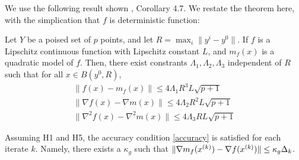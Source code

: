 We use the following result shown \cite{Billups_Larson_2013}, Corollary 4.7.
We restate the theorem here, with the simplication that $f$ is deterministic function:
\begin{lemma}
\label{change_radius}
Let $Y$ be a poised set of $p$ points, and let $R = \max_{i}\|y^i - y^0\|$.
If $f$ is a Lipschitz continuous function with Lipschitz constant $L$, and $m_f(x)$ is a quadratic model of $f$.
Then, there exist constrants $\Lambda_1, \Lambda_2, \Lambda_3$ independent of $R$ such that for all $x \in B(y^0, R)$,
\begin{align*}
\|f(x) - m_f(x)\| \le 4\Lambda_1 R^3L \sqrt{p+1} \\
\|\nabla f(x) - \nabla m(x)\| \le 4\Lambda_2R^2  L \sqrt{p+1} \\
\|\nabla^2 f(x) - \nabla^2 m(x)\| \le 4\Lambda_3  RL \sqrt{p+1}
\end{align*}
\end{lemma}





\begin{lemma}
Assuming H1 and H5, the accuracy condition \cref{accuracy} is satisfied for each iterate $k$.
Namely, there exists a $\kappa_{g}$ such that $\|\nabla m_f({x^{(k)}}) - \nabla f({x^{(k)}})\| \le \kappa_g \Delta_k$.
\end{lemma}

